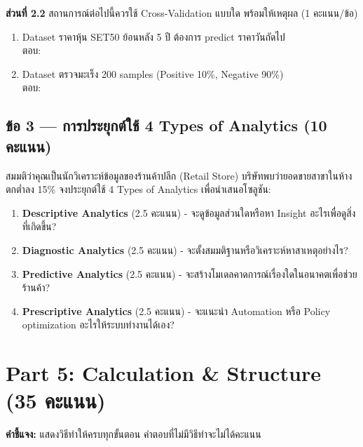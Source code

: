 \documentclass[a4paper,12pt]{article}
\newcommand{\blank}[1]{\fbox{\rule{0pt}{1.1em}\hspace{#1}}}
\begin{document}
\vspace{7cm}

\textbf{ส่วนที่ 2.2} สถานการณ์ต่อไปนี้ควรใช้ Cross-Validation แบบใด พร้อมให้เหตุผล (1 คะแนน/ข้อ)

\begin{enumerate}[label=\alph*.]
    \item Dataset ราคาหุ้น SET50 ย้อนหลัง 5 ปี ต้องการ predict ราคาวันถัดไป\\
    ตอบ: \blank{8cm}
    \vspace{0.5cm}
    \item Dataset ตรวจมะเร็ง 200 samples (Positive 10\%, Negative 90\%)\\
    ตอบ: \blank{8cm}
    \vspace{0.5cm}
\end{enumerate}

\newpage

\subsection*{ข้อ 3 — การประยุกต์ใช้ 4 Types of Analytics (10 คะแนน)}

สมมติว่าคุณเป็นนักวิเคราะห์ข้อมูลของร้านค้าปลีก (Retail Store) บริษัทพบว่ายอดขายสาขาในห้างตกต่ำลง 15\% จงประยุกต์ใช้ 4 Types of Analytics เพื่อนำเสนอโซลูชัน:

\begin{enumerate}
    \item \textbf{Descriptive Analytics} (2.5 คะแนน) - จะดูข้อมูลส่วนใดหรือหา Insight อะไรเพื่อดูสิ่งที่เกิดขึ้น?
    \vspace{2.5cm}
    \item \textbf{Diagnostic Analytics} (2.5 คะแนน) - จะตั้งสมมติฐานหรือวิเคราะห์หาสาเหตุอย่างไร?
    \vspace{2.5cm}
    \item \textbf{Predictive Analytics} (2.5 คะแนน) - จะสร้างโมเดลคาดการณ์เรื่องใดในอนาคตเพื่อช่วยร้านค้า?
    \vspace{2.5cm}
    \item \textbf{Prescriptive Analytics} (2.5 คะแนน) - จะแนะนำ Automation หรือ Policy optimization อะไรให้ระบบทำงานได้เอง?
    \vspace{2.5cm}
\end{enumerate}

\newpage

\section*{Part 5: Calculation \& Structure (35 คะแนน)}
\textbf{คำชี้แจง:} แสดงวิธีทำให้ครบทุกขั้นตอน คำตอบที่ไม่มีวิธีทำจะไม่ได้คะแนน
\end{document}
